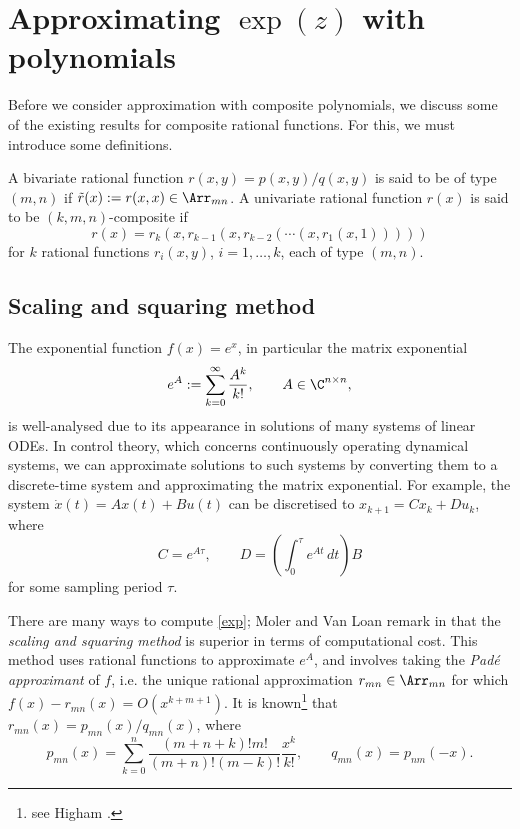 \chapter{Approximating $\exp(z)$ with polynomials}

Before we consider approximation with composite polynomials, we discuss some of the existing results for composite rational functions. For this, we must introduce some definitions.

\begin{defn}
A bivariate rational function $r(x,y)=p(x,y)/q(x,y)$ is said to be of type $(m,n)$ if $\tilde{r}(x):=r(x,x) \in \Arr_{mn}$. A univariate rational function $r(x)$ is said to be $(k,m,n)$-composite if
\[r(x) = r_k(x,r_{k-1}(x,r_{k-2}(\cdots(x,r_1(x,1)))))\]
for $k$ rational functions $r_i(x,y)$, $i=1,\dots,k$, each of type $(m,n)$. 
\end{defn}

\section{Scaling and squaring method}

The exponential function $f(x)=e^x$, in particular the matrix exponential 
\begin{align}
    e^A := \sum_{k=0}^\infty \dfrac{A^k}{k!}, \qquad A \in \C^{n\times n}, \label{exp}
\end{align}
is well-analysed due to its appearance in solutions of many systems of linear ODEs. In control theory, which concerns continuously operating dynamical systems, we can approximate solutions to such systems by converting them to a discrete-time system and approximating the matrix exponential. For example, the system $\dot{x}(t) = Ax(t)+Bu(t)$ can be discretised to $x_{k+1} = Cx_k + Du_k$, where
\[C = e^{A\tau}, \qquad D = \left(\int_0^\tau e^{At} \,dt\right)B\]
for some sampling period $\tau$.

\bigskip{}

There are many ways to compute \eqref{exp}; Moler and Van Loan remark in \cite{nineteen} that the \textit{scaling and squaring method} is superior in terms of computational cost. This method uses rational functions to approximate $e^A$, and involves taking the \textit{Padé approximant} of $f$, i.e. the unique rational approximation $r_{mn} \in \Arr_{mn}$ for which $f(x)-r_{mn}(x) = O(x^{k+m+1})$. It is known\footnote{see Higham \cite[p. 241]{Higham}.} that $r_{mn}(x) = p_{mn}(x)/q_{mn}(x)$, where
\[p_{mn}(x)=\sum_{k=0}^n \dfrac{(m+n+k)!m!}{(m+n)!(m-k)!} \dfrac{x^k}{k!}, \qquad q_{mn}(x) = p_{nm}(-x).\]

